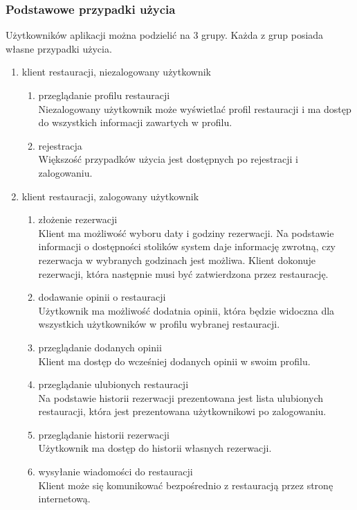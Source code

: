 \documentclass{article}
\begin{document}
\subsubsection{Podstawowe przypadki użycia}

Użytkowników aplikacji można podzielić na 3 grupy. Każda z grup posiada własne przypadki użycia.
\begin{enumerate}
\item klient restauracji, niezalogowany użytkownik
\begin{enumerate}
	\item przeglądanie profilu restauracji \\
	Niezalogowany użytkownik może wyświetlać profil restauracji i ma dostęp do wszystkich informacji zawartych w profilu.
	\item rejestracja \\
	Większość przypadków użycia jest dostępnych po rejestracji i zalogowaniu.
\end{enumerate}
	\item klient restauracji, zalogowany użytkownik
\begin{enumerate}
	\item złożenie rezerwacji \\
	Klient ma możliwość wyboru daty i godziny rezerwacji. Na podstawie informacji o dostępności stolików system daje informację zwrotną, czy rezerwacja w wybranych godzinach jest możliwa. Klient dokonuje rezerwacji, która następnie musi być zatwierdzona przez restaurację.
	\item dodawanie opinii o restauracji \\
	Użytkownik ma możliwość dodatnia opinii, która będzie widoczna dla wszystkich użytkowników w profilu wybranej restauracji.
	\item przeglądanie dodanych opinii \\
	Klient ma dostęp do wcześniej dodanych opinii w swoim profilu.
	\item przeglądanie ulubionych restauracji \\
	Na podstawie historii rezerwacji prezentowana jest lista ulubionych restauracji, która jest prezentowana użytkownikowi po zalogowaniu.
	\item przeglądanie historii rezerwacji \\
	Użytkownik ma dostęp do historii własnych rezerwacji.
	\item wysyłanie wiadomości do restauracji \\
	Klient może się komunikować bezpośrednio z restauracją przez stronę internetową.

\end{enumerate}
\end{enumerate}
\end{document}
